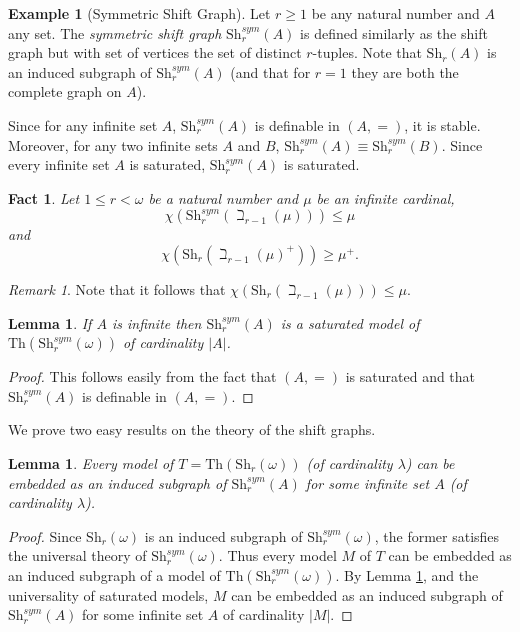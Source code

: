 \documentclass[a4paper]{amsart}
\theoremstyle{plain}
\newtheorem{lemma}[theorem]{Lemma}
\newtheorem{fact}[theorem]{Fact}
\theoremstyle{definition}
\newtheorem{example}[theorem]{Example}
\theoremstyle{remark}
\newtheorem{remark}[theorem]{Remark}
\numberwithin{equation}{section}
\newcommand{\Sh}{\text{Sh}}
\begin{document}
\begin{example}[Symmetric Shift Graph]
Let $r\geq 1$ be any natural number and $A$ any set. The \emph{symmetric shift graph} $\Sh_r^{sym}(A)$ is defined similarly as the shift graph but with set of vertices the set of distinct $r$-tuples.
Note that $\Sh_r(A)$ is an induced subgraph of $\Sh_r^{sym}(A)$ (and that for $r=1$ they are both the complete graph on $A$).

Since for any infinite set $A$, $\Sh_r^{sym}(A)$ is definable in $(A,=)$, it is stable. Moreover, for any two infinite sets $A$ and $B$, $\Sh_r^{sym}(A)\equiv \Sh_r^{sym}(B)$. Since every infinite set $A$ is saturated, $\Sh_r^{sym}(A)$ is saturated.
\end{example}


\begin{fact}\cite[Fact 2.6]{1196}\cite[Proof of Theorem 2]{EH-shift}\label{F:Sh-high chrom}
Let $1\leq r<\omega$ be a natural number and $\mu$ be an infinite cardinal,  \[\chi\left(\Sh_r^{sym}(\beth_{r-1}\left(\mu\right))\right)\leq\mu\] and \[\chi\left(\Sh_r(\beth_{r-1}\left(\mu\right)^{+})\right)\geq\mu^{+}.\]
\end{fact}

\begin{remark}
Note that it follows that $\chi(\Sh_{r}(\beth_{r-1}(\mu)))\leq \mu$.
\end{remark}


\begin{lemma}\label{L:sat of sym}
If $A$ is infinite then  $\Sh_r^{sym}(A)$ is a saturated model of $\mathrm{Th}(\Sh_r^{sym}(\omega))$ of cardinality $|A|$.
\end{lemma}
\begin{proof}
This follows easily from the fact that $(A,=)$ is saturated and that $\Sh_r^{sym}(A)$ is definable in $(A,=)$.
\end{proof}



We prove two easy results on the theory of the shift graphs.
\begin{lemma}\label{L:embed model of shift into symmetric}
Every model of  $T=\mathrm{Th}(\Sh_r(\omega))$ (of cardinality $\lambda$) can be embedded as an induced subgraph of $\Sh_r^{sym}(A)$ for some infinite set $A$ (of cardinality $\lambda$). 
\end{lemma}
\begin{proof}
Since $\Sh_r(\omega)$ is an induced subgraph of $\Sh_r^{sym}(\omega)$, the former satisfies the universal theory of $\Sh_r^{sym}(\omega)$. Thus every model $M$ of $T$ can be embedded as an induced subgraph of a model of $\mathrm{Th}(\Sh_r^{sym}(\omega))$. By Lemma \ref{L:sat of sym}, and the universality of saturated models, $M$ can be embedded as an induced subgraph of $\Sh_r^{sym}(A)$ for some infinite set $A$ of cardinality $|M|$.
\end{proof}
\end{document}
